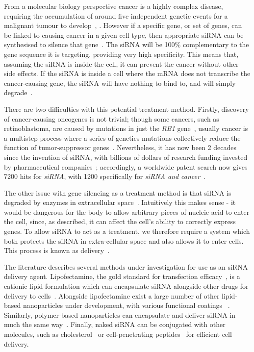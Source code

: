 From a molecular biology perspective cancer is a highly complex disease, requiring the accumulation of around five independent genetic events for a malignant tumour to develop~\cite[\textit{ch. 9}]{murray1993cell}, \cite[\textit{ch. 6}]{knowles2005introduction}. 
However if a specific gene, or set of genes, can be linked to causing cancer in a given cell type, then appropriate siRNA can be synthesised to silence that gene~\cite{dorsett2004sirnas}. 
The siRNA will be 100\% complementary to the gene sequence it is targeting, providing very high specificity. 
This means that, assuming the siRNA is inside the cell, it can prevent the cancer without other side effects. 
If the siRNA is inside a cell where the mRNA does not transcribe the cancer-causing gene, the siRNA will have nothing to bind to, and will simply degrade~\cite{dorsett2004sirnas}.

There are two difficulties with this potential treatment method. 
Firstly, discovery of cancer-causing oncogenes is not trivial; though some cancers, such as retinoblastoma, are caused by mutations in just the \textit{RB1} gene~\cite{chial2008tumor}, usually cancer is a multistep process where a series of genetics mutations collectively reduce the function of tumor-suppressor genes~\cite[\textit{ch. 9}]{murray1993cell}\cite[\textit{ch. 24}]{lodish1999molecular}. 
Nevertheless, it has now been 2 decades since the invention of siRNA, with billions of dollars of research funding invested by pharmaceutical companies~\cite{chakraborty2017therapeutic}; accordingly, a worldwide patent search now gives \num{7200} hits for \textit{siRNA}, with \num{1200} specifically for \textit{siRNA and cancer}~\cite{sirnapatent}. 

The other issue with gene silencing as a treatment method is that siRNA is degraded by enzymes in extracellular space~\cite{dorsett2004sirnas}.
Intuitively this makes sense - it would be dangerous for the body to allow arbitrary pieces of nucleic acid to enter the cell, since, as described, it can affect the cell's ability to correctly express genes. 
To allow siRNA to act as a treatment, we therefore require a system which both protects the siRNA in extra-cellular space and also allows it to enter cells. 
This process is known as delivery~\cite{tiwari2012drug}.

The literature describes several methods under investigation for use as an siRNA delivery agent.
Lipofectamine, the gold standard for transfection efficacy~\cite{thermolipofectamine}, is a cationic lipid formulation which can encapsulate siRNA alongside other drugs for delivery to cells~\cite{liu2017efficient}. 
Alongside lipofectamine exist a large number of other lipid-based nanoparticles under development, with various functional coatings ~\cite{xu2015delivery}. %
Similarly, polymer-based nanoparticles can encapsulate and deliver siRNA in much the same way~\cite{sahoo2003nanotech, wang2009advances}. 
Finally, naked siRNA can be conjugated with other molecules, such as cholesterol~\cite{soutschek2004therapeutic} or cell-penetrating peptides~\cite{chiu2004visualizing} for efficient cell delivery. 


